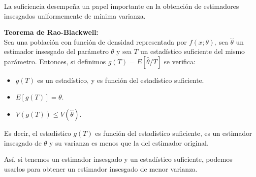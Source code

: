 La suficiencia desempe\~na un papel importante en la obtenci\'on de estimadores insesgados uniformemente de m\'inima varianza.

\begin{teorema}
\textbf{Teorema de Rao-Blackwell:}\\
Sea una poblaci\'on con funci\'on de densidad representada por $f(x;\theta)$, sea $\hat{\theta}$ un estimador insesgado del par\'ametro $\theta$ y sea $T$ un estad\'istico suficiente del mismo par\'ametro. Entonces, si definimos $g(T)=E[\hat{\theta}/T]$ se verifica:
\begin{itemize}
\item $g(T)$ es un estad\'istico, y es funci\'on del estad\'istico suficiente.
\item $E[g(T)]=\theta$.
\item $V(g(T))\leq V(\hat{\theta})$.
\end{itemize}
Es decir, el estad\'istico $g(T)$ es funci\'on del estad\'istico suficiente, es un estimador insesgado de $\theta$ y su varianza es menos que la del estimador original.
\end{teorema}

As\'i, si tenemos un estimador insesgado y un estad\'istico suficiente, podemos usarlos para obtener un estimador insesgado de menor varianza.
